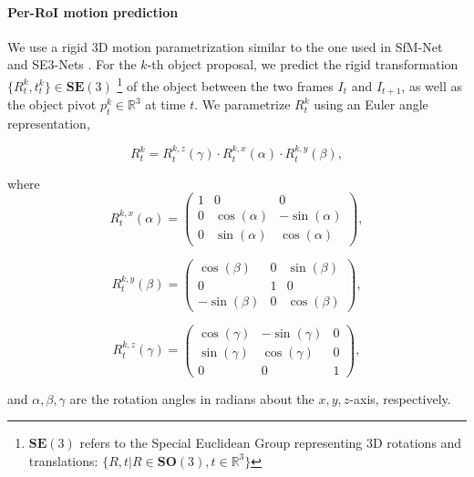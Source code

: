 \paragraph{Per-RoI motion prediction}
We use a rigid 3D motion parametrization similar to the one used in SfM-Net and SE3-Nets \cite{SfmNet,SE3Nets}.
For the $k$-th object proposal, we predict the rigid transformation $\{R_t^k, t_t^k\}\in \mathbf{SE}(3)$
\footnote{$\mathbf{SE}(3)$ refers to the Special Euclidean Group representing 3D rotations
and translations: $\{R, t|R \in \mathbf{SO}(3), t \in \mathbb{R}^3\}$}
of the object between the two frames $I_t$ and $I_{t+1}$, as well as the object pivot $p_t^k \in \mathbb{R}^3$ at time $t$.
We parametrize ${R_t^k}$ using an Euler angle representation,

\begin{equation}
R_t^k = R_t^{k,z}(\gamma) \cdot R_t^{k,x}(\alpha) \cdot R_t^{k,y}(\beta),
\end{equation}

where
\begin{equation}
R_t^{k,x}(\alpha) =
\begin{pmatrix}
  1 & 0 & 0 \\
  0 & \cos(\alpha) & -\sin(\alpha) \\
  0 & \sin(\alpha) & \cos(\alpha)
\end{pmatrix},
\end{equation}

\begin{equation}
R_t^{k,y}(\beta) =
\begin{pmatrix}
  \cos(\beta) & 0 & \sin(\beta) \\
  0 & 1 & 0 \\
  -\sin(\beta) & 0 & \cos(\beta)
\end{pmatrix},
\end{equation}

\begin{equation}
R_t^{k,z}(\gamma) =
\begin{pmatrix}
  \cos(\gamma) & -\sin(\gamma) & 0 \\
  \sin(\gamma) & \cos(\gamma) & 0 \\
  0 & 0 & 1
\end{pmatrix},
\end{equation}

and $\alpha, \beta, \gamma$ are the rotation angles in radians about the $x,y,z$-axis, respectively.

